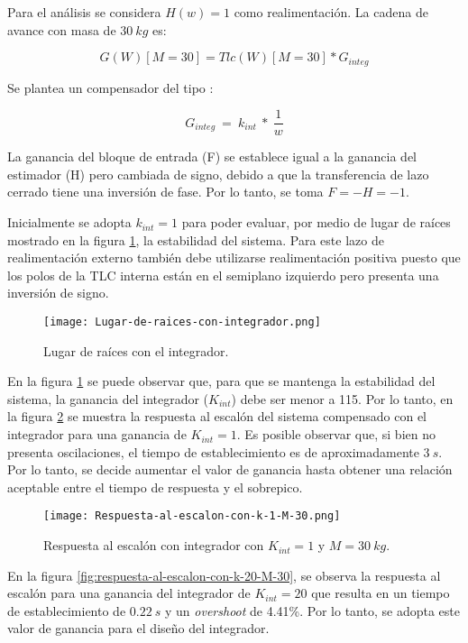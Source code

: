 \noindent Para el an\'{a}lisis se considera $H(w)=1$ como realimentaci\'{o}n. La cadena de avance con masa de $30\:kg$ es:

\[G(W)[M=30]=Tlc(W)[M=30]*G_{integ}\] 

\noindent Se  plantea un compensador del tipo :

\[G_{integ}\ =\ k_{int}\ *\ \frac{1}{w}\] 

\noindent La ganancia del bloque de entrada (F) se establece igual a la ganancia del estimador (H) pero cambiada de signo, debido a que la transferencia de lazo cerrado tiene una inversi\'{o}n de fase. Por lo tanto, se toma $F=-H=-1$.

\noindent Inicialmente se adopta $k_{int} = 1$ para poder evaluar, por medio de lugar de ra\'{i}ces mostrado en la figura \ref{fig:lugar-de-raices-con-integrador}, la estabilidad del sistema. Para este lazo de realimentaci\'{o}n externo tambi\'{e}n debe utilizarse realimentaci\'{o}n positiva puesto que los polos de la TLC interna est\'{a}n en el semiplano izquierdo pero presenta una inversi\'{o}n de signo.


\begin{figure}[H]
	\centering
	\texttt{[image: Lugar-de-raices-con-integrador.png]}
	\caption{Lugar de raíces con el integrador.}
	\label{fig:lugar-de-raices-con-integrador}
\end{figure}


\noindent En la figura \ref{fig:lugar-de-raices-con-integrador} se puede observar que, para que se mantenga la estabilidad del sistema, la ganancia del integrador ($K_{int}$) debe ser menor a 115. Por lo tanto, en la figura \ref{fig:respuesta-al-escalon-con-k-1-M-30} se muestra la respuesta al escal\'{o}n del sistema compensado con el integrador para una ganancia de $K_{int}=1$.  Es posible observar que, si bien no presenta oscilaciones, el tiempo de establecimiento es de aproximadamente $3\:s$. Por lo tanto, se decide aumentar el valor de ganancia hasta obtener una relaci\'{o}n aceptable entre el tiempo de respuesta y el sobrepico.


\begin{figure}[H]
	\centering
	\texttt{[image: Respuesta-al-escalon-con-k-1-M-30.png]}
	\caption{Respuesta al escalón con integrador con $K_{int} =1$ y $M=30\:kg$.}
	\label{fig:respuesta-al-escalon-con-k-1-M-30}
\end{figure}


\noindent En la figura \ref{fig:respuesta-al-escalon-con-k-20-M-30}, se observa la respuesta al escal\'{o}n para una ganancia del integrador de $K_{int}=20$ que resulta en un tiempo de establecimiento de $0.22\:s$ y un \textsl{overshoot} de 4.41\%. Por lo tanto, se adopta este valor de ganancia para el dise\~{n}o del integrador.

